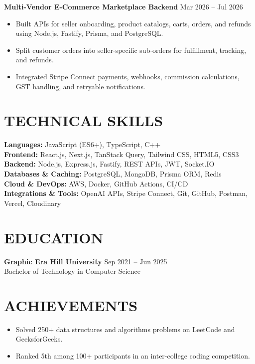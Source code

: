 \documentclass[a4paper,11pt]{article}
\begin{document}
\vspace{3pt}
\textbf{Multi-Vendor E-Commerce Marketplace Backend} \hfill Mar 2026 -- Jul 2026
\begin{itemize}
    \item Built APIs for seller onboarding, product catalogs, carts, orders, and refunds using Node.js, Fastify, Prisma, and PostgreSQL.
    \item Split customer orders into seller-specific sub-orders for fulfillment, tracking, and refunds.
    \item Integrated Stripe Connect payments, webhooks, commission calculations, GST handling, and retryable notifications.
\end{itemize}

\section*{TECHNICAL SKILLS}

\textbf{Languages:} JavaScript (ES6+), TypeScript, C++\\[2pt]
\textbf{Frontend:} React.js, Next.js, TanStack Query, Tailwind CSS, HTML5, CSS3\\[2pt]
\textbf{Backend:} Node.js, Express.js, Fastify, REST APIs, JWT, Socket.IO\\[2pt]
\textbf{Databases \& Caching:} PostgreSQL, MongoDB, Prisma ORM, Redis\\[2pt]
\textbf{Cloud \& DevOps:} AWS, Docker, GitHub Actions, CI/CD\\[2pt]
\textbf{Integrations \& Tools:} OpenAI APIs, Stripe Connect, Git, GitHub, Postman, Vercel, Cloudinary

\section*{EDUCATION}

\textbf{Graphic Era Hill University} \hfill Sep 2021 -- Jun 2025\\
Bachelor of Technology in Computer Science

\section*{ACHIEVEMENTS}

\begin{itemize}
    \item Solved 250+ data structures and algorithms problems on LeetCode and GeeksforGeeks.
    \item Ranked 5th among 100+ participants in an inter-college coding competition.
\end{itemize}
\end{document}

